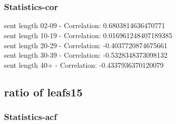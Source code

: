 \documentclass{article}%
\begin{document}
\begin{figure}[ht]%
\centering%
\setlength{\abovecaptionskip}{-35pt}%
%
%
\\%
%
%
\\%
%
\end{figure}

%
\newpage%
\subsubsection{Statistics{-}cor}%
\label{ssubsec:Statistics{-}cor}%
\noindent%
sent length 02-09 - Correlation: 0.6803814636470771\\%
sent length 10-19 - Correlation: 0.016961248407189385\\%
sent length 20-29 - Correlation: -0.4037720874675661\\%
sent length 30-39 - Correlation: -0.5328348373098132\\%
sent length 40+ - Correlation: -0.4337936370120079\\

%
\newpage

%
\subsection{ratio of leafs15}%
\label{subsec:ratioofleafs15}%
\subsubsection{Statistics{-}acf}%
\label{ssubsec:Statistics{-}acf}%
\end{document}
